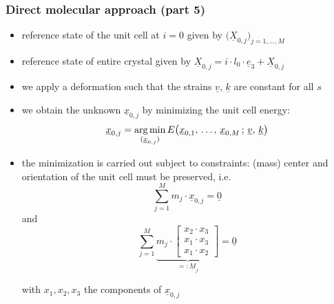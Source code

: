 \begin{frame}
  \frametitle{Direct molecular approach (part 5)}

  
  \begin{itemize}
    \item reference state of the unit cell at $i=0$ given by $\bigl( \underline{X}_{0,j} \bigr)_{j=1,\dots,M}$
    \item reference state of entire crystal given by $\underline{X}_{0,j} = i \cdot l_0 \cdot \underline{e}_3 + \underline{X}_{0,j}$
    \item we apply a deformation such that the strains $\underline{v},\,\underline{k}$ are constant for all $s$
    \item we obtain the unknown $\underline{x}_{0,j}$ by minimizing the unit cell energy:
      \begin{displaymath}
        \underline{x}_{0,j} = \operatorname*{\arg \min}_{(\underline{x}_{0,j})} E \bigl( \underline{x}_{0,1}, \, \dots , \, \underline{x}_{0,M} \, ; \, \underline{v}, \, \underline{k} \bigr) 
      \end{displaymath}
    \item the minimization is carried out subject to constraints: \newline
      (mass) center and orientation of the unit cell must be preserved, i.e.
      \begin{displaymath}
        \sum_{j=1}^M m_j \cdot \underline{x}_{0,j} = \underline{0}
      \end{displaymath}
      and
      \begin{displaymath}
        \sum_{j=1}^M 
        \underbrace{ m_j \cdot 
        \begin{bmatrix}
          x_2 \cdot x_3 \\
          x_1 \cdot x_3 \\
          x_1 \cdot x_2 
        \end{bmatrix} }_{=: \underline{M}_j} = \underline{0}
      \end{displaymath}
      
      \vspace{-1.2em}
      with $x_1,x_2,x_3$ the components of $\underline{x}_{0,j}$
  \end{itemize}
\end{frame}


